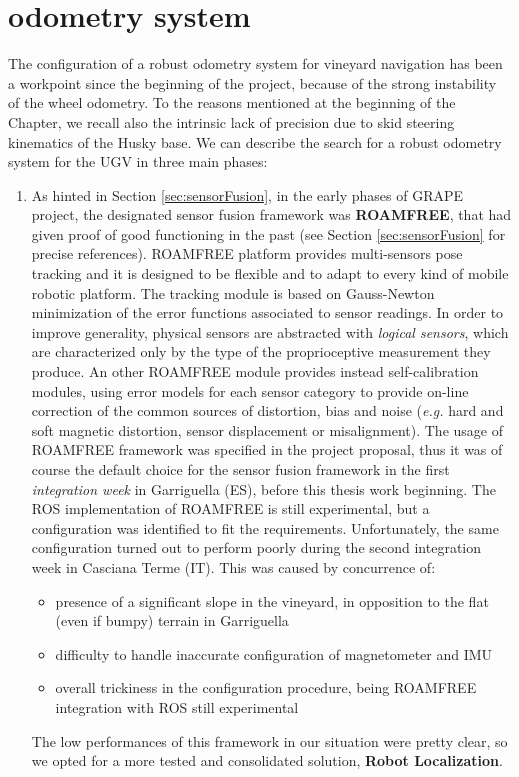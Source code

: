 \section{odometry system}\label{sec:odometrySystem}

The configuration of a robust odometry system for vineyard navigation has been a workpoint since the beginning of the project, because of the strong instability of the wheel odometry. To the reasons mentioned at the beginning of the Chapter, we recall also the intrinsic lack of precision due to skid steering kinematics of the Husky base.
We can describe the search for a robust odometry system for the \ac{UGV} in three main phases:
\begin{enumerate}
	\item As hinted in Section \ref{sec:sensorFusion}, in the early phases of \ac{GRAPE} project, the designated sensor fusion framework was \textbf{ROAMFREE}, that had given proof of good functioning in the past (see Section \ref{sec:sensorFusion} for precise references). ROAMFREE platform provides multi-sensors pose tracking and it is designed to be flexible and to adapt to every kind of mobile robotic platform. The tracking module is based on Gauss-Newton minimization of the error functions associated to sensor readings. In order to improve generality, physical sensors are abstracted with \textit{logical sensors}, which are characterized only by the type of the proprioceptive measurement they produce. An other ROAMFREE module provides instead self-calibration modules, using error models for each sensor category to provide on-line correction of the common sources of distortion, bias and noise (\textit{e.g.} hard and soft magnetic distortion, sensor displacement or misalignment). The usage of ROAMFREE framework was specified in the project proposal, thus it was of course the default choice for the sensor fusion framework in the first \textit{integration week} in Garriguella (ES), before this thesis work beginning. The \ac{ROS} implementation of ROAMFREE is still experimental, but a configuration was identified to fit the requirements. Unfortunately, the same configuration turned out to perform poorly during the second integration week in Casciana Terme (IT). This was caused by concurrence of:
	\begin{itemize}
		\item presence of a significant slope in the vineyard, in opposition to the flat (even if bumpy) terrain in Garriguella
		\item difficulty to handle inaccurate configuration of magnetometer and \ac{IMU}
		\item overall trickiness in the configuration procedure, being ROAMFREE integration with \ac{ROS} still experimental
	\end{itemize}
	The low performances of this framework in our situation were pretty clear, so we opted for a more tested and consolidated solution, \textbf{Robot Localization}.
	

\end{enumerate}
